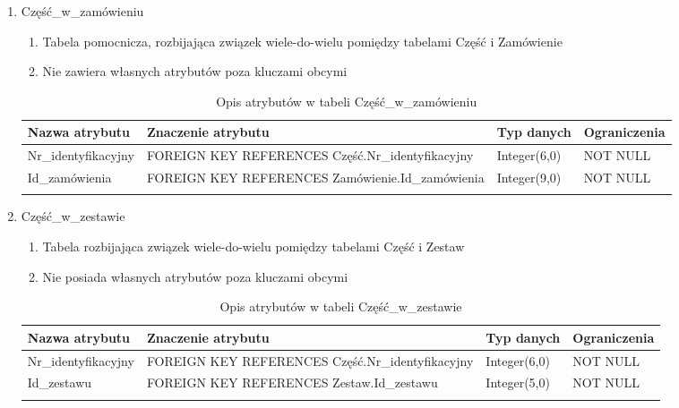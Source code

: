 \begin{enumerate}
  \item Część\_w\_zamówieniu
  	\begin{enumerate}
  	  \item Tabela pomocnicza, rozbijająca związek wiele-do-wielu pomiędzy
  	  tabelami Część i Zamówienie
  	  \item Nie zawiera własnych atrybutów poza kluczami obcymi
  	\end{enumerate}
  	{\footnotesize
  	\begin{longtable}{|p{3cm}|p{5cm}|p{2.5cm}|p{2.5cm}|}
  	\hline
  	\textbf{Nazwa atrybutu} & \textbf{Znaczenie atrybutu} & \textbf{Typ danych} &
  	\textbf{Ograniczenia} \\
  	\hline
  	Nr\_identyfikacyjny & FOREIGN KEY REFERENCES Część.Nr\_identyfikacyjny  &
  	Integer(6,0) & NOT NULL
  	\\
  	\hline
  	Id\_zamówienia & FOREIGN KEY REFERENCES Zamówienie.Id\_zamówienia &
  	Integer(9,0) & NOT NULL
  	\\
  	\hline
	\caption{Opis atrybutów w tabeli Część\_w\_zamówieniu}
	\end{longtable}}
  \item Część\_w\_zestawie
  	\begin{enumerate}
  	  \item Tabela rozbijająca związek wiele-do-wielu pomiędzy tabelami Część i
  	  Zestaw
  	  \item Nie posiada własnych atrybutów poza kluczami obcymi
  	\end{enumerate}
  	{\footnotesize
  	\begin{longtable}{|p{3cm}|p{5cm}|p{2.5cm}|p{2.5cm}|}
  	\hline
  	\textbf{Nazwa atrybutu} & \textbf{Znaczenie atrybutu} & \textbf{Typ danych} &
  	\textbf{Ograniczenia} \\
  	\hline
  	Nr\_identyfikacyjny & FOREIGN KEY REFERENCES Część.Nr\_identyfikacyjny  &
  	Integer(6,0) & NOT NULL
  	\\
  	\hline
  	Id\_zestawu & FOREIGN KEY REFERENCES Zestaw.Id\_zestawu & Integer(5,0) &
  	NOT NULL
  	\\
  	\hline
	\caption{Opis atrybutów w tabeli Część\_w\_zestawie}
	\end{longtable}}
\end{enumerate}
